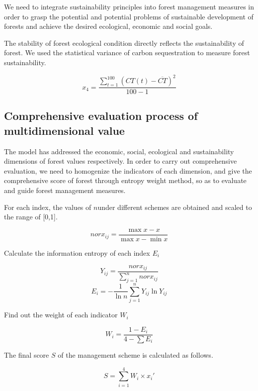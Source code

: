 We need to integrate sustainability principles into forest management measures in order to grasp the potential and potential problems of sustainable development of forests and achieve the desired ecological, economic and social goals.

The stability of forest ecological condition directly reflects the sustainability of forest. We used the statistical variance of carbon sequestration to measure forest sustainability.

$$
x_4=\frac{\sum_{t=1}^{100}(CT(t)-\overline{CT})^2}{100-1}
$$




\subsection{Comprehensive evaluation process of multidimensional value}

The model has addressed the economic, social, ecological and sustainability dimensions of forest values respectively. In order to carry out comprehensive evaluation, we need to homogenize the indicators of each dimension, and give the comprehensive score of forest through entropy weight method, so as to evaluate and guide forest management measures. 

For each index, the values of $n$under different schemes are obtained and scaled to the range of [0,1].

$$
norx_{ij}=\frac{\max x-x}{\max x-\min x}
$$

Calculate the information entropy of each index $E_i$

$$
Y_{ij}=\frac{norx_{ij}}{\sum_{j=1}^n norx_{ij}}
$$
$$
E_i=-\frac{1}{\ln n}\sum_{j=1}^{n}Y_{ij}\ln Y_{ij}
$$

Find out the weight of each indicator $W_i$

$$
W_i=\frac{1-E_i}{4-\sum E_i}
$$

The final score $S$ of the management scheme is calculated as follows.

$$
S=\sum_{i=1}^4 W_i\times x_i'
$$

